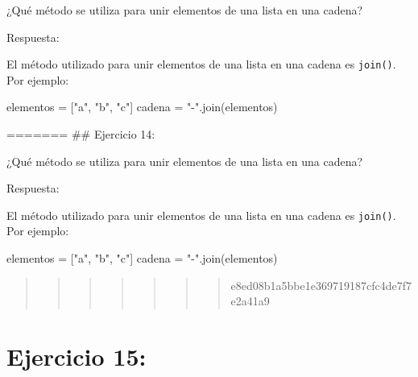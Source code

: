 \documentclass[
  a4paper,
  onepage,
  openany]{scrreprt}
\newenvironment{Shaded}{\begin{snugshade}}{\end{snugshade}}
\newcommand{\NormalTok}[1]{\textcolor[rgb]{0.00,0.23,0.31}{#1}}
\newcommand{\OperatorTok}[1]{\textcolor[rgb]{0.37,0.37,0.37}{#1}}
\newcommand{\StringTok}[1]{\textcolor[rgb]{0.13,0.47,0.30}{#1}}
\begin{document}
¿Qué método se utiliza para unir elementos de una lista en una cadena?

Respuesta:

El método utilizado para unir elementos de una lista en una cadena es
\texttt{join()}. Por ejemplo:

\begin{Shaded}
\begin{Highlighting}[]
\NormalTok{elementos }\OperatorTok{=}\NormalTok{ [}\StringTok{"a"}\NormalTok{, }\StringTok{"b"}\NormalTok{, }\StringTok{"c"}\NormalTok{]}
\NormalTok{cadena }\OperatorTok{=} \StringTok{"{-}"}\NormalTok{.join(elementos)}
\end{Highlighting}
\end{Shaded}

======= \#\# Ejercicio 14:

¿Qué método se utiliza para unir elementos de una lista en una cadena?

Respuesta:

El método utilizado para unir elementos de una lista en una cadena es
\texttt{join()}. Por ejemplo:

\begin{Shaded}
\begin{Highlighting}[]
\NormalTok{elementos }\OperatorTok{=}\NormalTok{ [}\StringTok{"a"}\NormalTok{, }\StringTok{"b"}\NormalTok{, }\StringTok{"c"}\NormalTok{]}
\NormalTok{cadena }\OperatorTok{=} \StringTok{"{-}"}\NormalTok{.join(elementos)}
\end{Highlighting}
\end{Shaded}

\begin{quote}
\begin{quote}
\begin{quote}
\begin{quote}
\begin{quote}
\begin{quote}
\begin{quote}
e8ed08b1a5bbe1e369719187cfc4de7f7e2a41a9
\end{quote}
\end{quote}
\end{quote}
\end{quote}
\end{quote}
\end{quote}
\end{quote}

\hypertarget{ejercicio-15}{%
\chapter{Ejercicio 15:}\label{ejercicio-15}}
\end{document}
